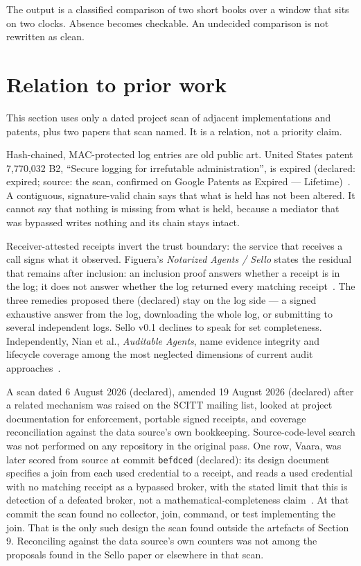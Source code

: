 \documentclass[11pt]{article}
\begin{document}
The output is a classified comparison of two short books over a window that sits on two clocks. Absence becomes checkable. An undecided comparison is not rewritten as clean.

\section{Relation to prior work}

This section uses only a dated project scan of adjacent implementations and patents, plus two papers that scan named. It is a relation, not a priority claim.

Hash-chained, MAC-protected log entries are old public art. United States patent 7,770,032 B2, ``Secure logging for irrefutable administration'', is expired (declared: expired; source: the scan, confirmed on Google Patents as Expired --- Lifetime)~\cite{us7770032}. A contiguous, signature-valid chain says that what is held has not been altered. It cannot say that nothing is missing from what is held, because a mediator that was bypassed writes nothing and its chain stays intact.

Receiver-attested receipts invert the trust boundary: the service that receives a call signs what it observed. Figuera's \emph{Notarized Agents / Sello} states the residual that remains after inclusion: an inclusion proof answers whether a receipt is in the log; it does not answer whether the log returned every matching receipt~\cite{figuera2026notarized}. The three remedies proposed there (declared) stay on the log side --- a signed exhaustive answer from the log, downloading the whole log, or submitting to several independent logs. Sello v0.1 declines to speak for set completeness. Independently, Nian et al., \emph{Auditable Agents}, name evidence integrity and lifecycle coverage among the most neglected dimensions of current audit approaches~\cite{nian2026auditable}.

A scan dated 6 August 2026 (declared), amended 19 August 2026 (declared) after a related mechanism was raised on the SCITT mailing list, looked at project documentation for enforcement, portable signed receipts, and coverage reconciliation against the data source's own bookkeeping. Source-code-level search was not performed on any repository in the original pass. One row, Vaara, was later scored from source at commit \texttt{befdced} (declared): its design document specifies a join from each used credential to a receipt, and reads a used credential with no matching receipt as a bypassed broker, with the stated limit that this is detection of a defeated broker, not a mathematical-completeness claim~\cite{vaara2026}. At that commit the scan found no collector, join, command, or test implementing the join. That is the only such design the scan found outside the artefacts of Section 9. Reconciling against the data source's own counters was not among the proposals found in the Sello paper or elsewhere in that scan.
\end{document}
